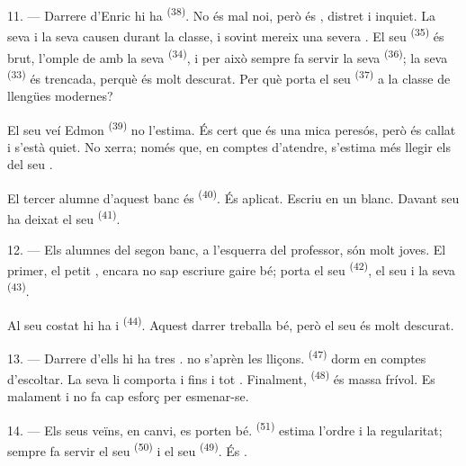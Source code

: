 \VUsaut{4.2mm}
\VUsaut{3.2mm}

11. --- Darrere d'Enric hi ha  \textsuperscript{(38)}. No és mal
noi, però és , distret i inquiet. La seva  i
la seva  causen  durant la classe, i sovint
mereix una severa . El seu 
\textsuperscript{(35)} és brut, l'omple de  amb la seva
 \textsuperscript{(34)}, i per això sempre fa servir la seva
 \textsuperscript{(36)}; la seva 
\textsuperscript{(33)} és trencada, perquè és molt descurat. Per què porta el seu
 \textsuperscript{(37)} a la classe de llengües modernes?

El seu veí Edmon \textsuperscript{(39)} no l'estima. És cert que és una mica
peresós, però és callat i s'està quiet. No xerra; només que, en comptes
d'atendre, s'estima més llegir els  del seu .

El tercer alumne d'aquest banc és  \textsuperscript{(40)}. És
aplicat. Escriu en un  blanc. Davant seu ha deixat el seu
 \textsuperscript{(41)}.

12. --- Els alumnes del segon banc, a l'esquerra del professor, són molt joves.
El primer, el petit , encara no sap escriure gaire bé; porta el seu
 \textsuperscript{(42)}, el seu  i la
seva  \textsuperscript{(43)}.

Al seu costat hi ha  i  \textsuperscript{(44)}.
Aquest darrer treballa bé, però el seu  és molt descurat.

13. --- Darrere d'ells hi ha tres .  no s'aprèn
les lliçons.  \textsuperscript{(47)} dorm en comptes d'escoltar.
La seva  li comporta  i fins i tot
. Finalment,  \textsuperscript{(48)} és massa
frívol. Es  malament i no fa cap esforç per esmenar-se.

14. --- Els seus veïns, en canvi, es porten bé. 
\textsuperscript{(51)} estima l'ordre i la regularitat; sempre fa servir el seu
 \textsuperscript{(50)} i el seu 
\textsuperscript{(49)}. És .

